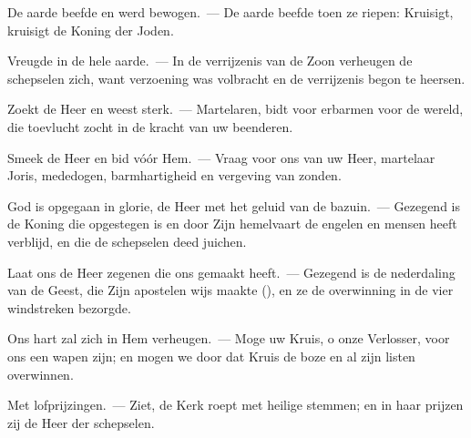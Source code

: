 \documentclass[12pt,twoside,a5paper]{article}
\begin{document}
\begin{halfparskip}
  De aarde beefde en werd bewogen.~--- De aarde beefde toen ze riepen: Kruisigt, kruisigt de Koning der Joden.

  Vreugde in de hele aarde.~--- In de verrijzenis van de Zoon verheugen de schepselen zich, want verzoening was volbracht en de verrijzenis begon te heersen.

  Zoekt de Heer en weest sterk.~--- Martelaren, bidt voor erbarmen voor de wereld, die toevlucht zocht in de kracht van uw beenderen.

  Smeek de Heer en bid vóór Hem.~--- Vraag voor ons van uw Heer, martelaar Joris, mededogen, barmhartigheid en vergeving van zonden.

  God is opgegaan in glorie, de Heer met het geluid van de bazuin.~--- Gezegend is de Koning die opgestegen is en door Zijn hemelvaart de engelen en mensen heeft verblijd, en die de schepselen deed juichen.

  Laat ons de Heer zegenen die ons gemaakt heeft.~--- Gezegend is de nederdaling van de Geest, die Zijn apostelen wijs maakte (), en ze de overwinning in de vier windstreken bezorgde.

  Ons hart zal zich in Hem verheugen.~--- Moge uw Kruis, o onze Verlosser, voor ons een wapen zijn; en mogen we door dat Kruis de boze en al zijn listen overwinnen.

  Met lofprijzingen.~--- Ziet, de Kerk roept met heilige stemmen; en in haar prijzen zij de Heer der schepselen.
\end{halfparskip}
\end{document}
